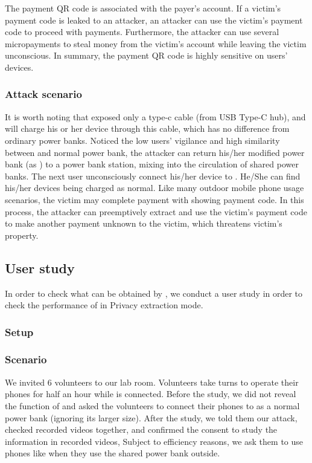 The payment QR code is associated with the payer's account. If a victim's payment code is leaked to an attacker, an attacker can use the victim's payment code to proceed with payments. Furthermore, the attacker can use several micropayments to steal money from the victim's account while leaving the victim unconscious. In summary, the payment QR code is highly sensitive on users' devices.

\subsubsection{Attack scenario}

It is worth noting that \tool exposed only a type-c cable (from USB Type-C hub),
and \tool will charge his or her device through this cable, which has no difference from ordinary power banks. Noticed the low users' vigilance and high similarity between \tool and normal power bank, the attacker can return his/her modified power bank (as \tool) to a power bank station, mixing \tool into the circulation of shared power banks. The next user unconsciously connect his/her device to \tool. 
He/She can find his/her devices being charged as normal.
Like many outdoor mobile phone usage scenarios, the victim may complete payment with showing payment code. In this process, the attacker can preemptively extract and use the victim's payment code to make another payment unknown to the victim, which threatens victim's property.


\subsection{User study}

In order to check what can be obtained by \tool, we conduct a user study in order to check the performance of \tool in Privacy extraction mode.

\subsubsection{Setup}

\subsubsection{Scenario}

We invited 6 volunteers to our lab room. Volunteers take turns to operate their phones for half an hour while \tool is connected. Before the study, we did not reveal the function of \tool and asked the volunteers to connect their phones to \tool as a normal power bank (ignoring its larger size). 
After the study, we told them our attack, checked recorded videos together, and confirmed the consent to study the information in recorded videos, Subject to efficiency reasons, we ask them to use phones like when they use the shared power bank outside.



